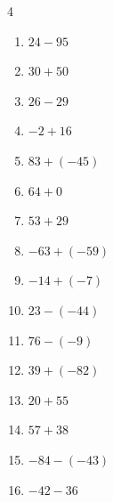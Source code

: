 \begin{multicols}{4}
\begin{enumerate}
  \item $24-95$

        \phantom{$=-71$}

  \item $30+50$

        \phantom{$=80$}

  \item $26-29$

        \phantom{$=-3$}

  \item $-2+16$

        \phantom{$=14$}

  \item $83+(-45)$

        \phantom{$=38$}

  \item $64+0$

        \phantom{$=64$}

\columnbreak %

  \item $53+29$

        \phantom{$=82$}

  \item $-63+(-59)$

        \phantom{$=-122$}

  \item $-14+(-7)$

        \phantom{$=-21$}

  \item $23-(-44)$

        \phantom{$=67$}

  \item $76-(-9)$

        \phantom{$=85$}

  \item $39+(-82)$

        \phantom{$=-43$}

  \item $20+55$

        \phantom{$=75$}

  \item $57+38$

        \phantom{$=95$}

  \item $-84-(-43)$

        \phantom{$=-41$}

  \item $-42-36$


\end{enumerate}
\end{multicols}
